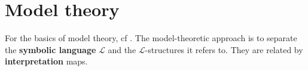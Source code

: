 \documentclass[orivec]{llncs}
\begin{document}

\section{Model theory}

For the basics of model theory, cf \cite{Doets1996} \cite{Manzano1999}.  The model-theoretic approach is to separate the \textbf{symbolic language} $\mathcal{L}$ and the $\mathcal{L}$-structures it refers to.  They are related by \textbf{interpretation} maps.

\end{document}
